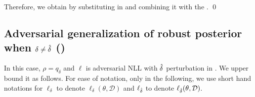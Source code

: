 Therefore, we obtain  by substituting  in  and combining it with the .
\qed

\clearpage
\subsection{Adversarial generalization of robust posterior when $\delta \ne \hat{\delta}$ (\MakeLowercase{)}}

In this case, $\rho = q_\delta$ and $\ell$ is adversarial NLL with $\hat{\delta}$ perturbation in . We upper bound it as follows.
%
For ease of notation, only in the following, we use short hand notations for $\ell_\delta$ to denote $\ell_\delta(\theta, \mathcal{D})$ and $\ell_{\hat{\delta}}$ to denote $\ell_{\hat{\delta}}(\theta, \mathcal{D})$.

